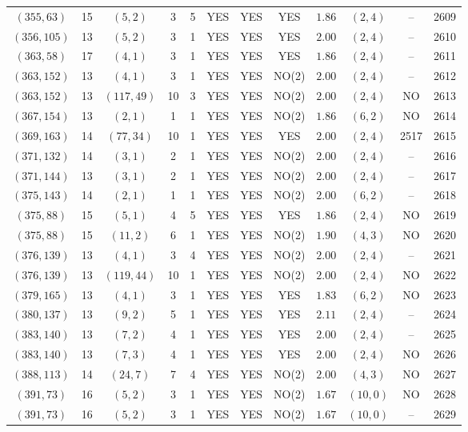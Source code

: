 \begin{longtable}{|c|c|c|c|c|c|c|c|c|c|c|c|}
$(355,63)$ & 15 & $(5,2)$ & 3 & 5 & YES & YES & YES & $1.86$ & $(2,4)$ & -- & 2609\\
$(356,105)$ & 13 & $(5,2)$ & 3 & 1 & YES & YES & YES & $2.00$ & $(2,4)$ & -- & 2610\\
$(363,58)$ & 17 & $(4,1)$ & 3 & 1 & YES & YES & YES & $1.86$ & $(2,4)$ & -- & 2611\\
$(363,152)$ & 13 & $(4,1)$ & 3 & 1 & YES & YES & NO(2) & $2.00$ & $(2,4)$ & -- & 2612\\
$(363,152)$ & 13 & $(117,49)$ & 10 & 3 & YES & YES & NO(2) & $2.00$ & $(2,4)$ & NO & 2613\\
$(367,154)$ & 13 & $(2,1)$ & 1 & 1 & YES & YES & NO(2) & $1.86$ & $(6,2)$ & NO & 2614\\
$(369,163)$ & 14 & $(77,34)$ & 10 & 1 & YES & YES & YES & $2.00$ & $(2,4)$ & 2517 & 2615\\
$(371,132)$ & 14 & $(3,1)$ & 2 & 1 & YES & YES & NO(2) & $2.00$ & $(2,4)$ & -- & 2616\\
$(371,144)$ & 13 & $(3,1)$ & 2 & 1 & YES & YES & NO(2) & $2.00$ & $(2,4)$ & -- & 2617\\
$(375,143)$ & 14 & $(2,1)$ & 1 & 1 & YES & YES & NO(2) & $2.00$ & $(6,2)$ & -- & 2618\\
$(375,88)$ & 15 & $(5,1)$ & 4 & 5 & YES & YES & YES & $1.86$ & $(2,4)$ & NO & 2619\\
$(375,88)$ & 15 & $(11,2)$ & 6 & 1 & YES & YES & NO(2) & $1.90$ & $(4,3)$ & NO & 2620\\
$(376,139)$ & 13 & $(4,1)$ & 3 & 4 & YES & YES & NO(2) & $2.00$ & $(2,4)$ & -- & 2621\\
$(376,139)$ & 13 & $(119,44)$ & 10 & 1 & YES & YES & NO(2) & $2.00$ & $(2,4)$ & NO & 2622\\
$(379,165)$ & 13 & $(4,1)$ & 3 & 1 & YES & YES & YES & $1.83$ & $(6,2)$ & NO & 2623\\
$(380,137)$ & 13 & $(9,2)$ & 5 & 1 & YES & YES & YES & $2.11$ & $(2,4)$ & -- & 2624\\
$(383,140)$ & 13 & $(7,2)$ & 4 & 1 & YES & YES & YES & $2.00$ & $(2,4)$ & -- & 2625\\
$(383,140)$ & 13 & $(7,3)$ & 4 & 1 & YES & YES & YES & $2.00$ & $(2,4)$ & NO & 2626\\
$(388,113)$ & 14 & $(24,7)$ & 7 & 4 & YES & YES & NO(2) & $2.00$ & $(4,3)$ & NO & 2627\\
$(391,73)$ & 16 & $(5,2)$ & 3 & 1 & YES & YES & NO(2) & $1.67$ & $(10,0)$ & NO & 2628\\
$(391,73)$ & 16 & $(5,2)$ & 3 & 1 & YES & YES & NO(2) & $1.67$ & $(10,0)$ & -- & 2629\\

\end{longtable}
